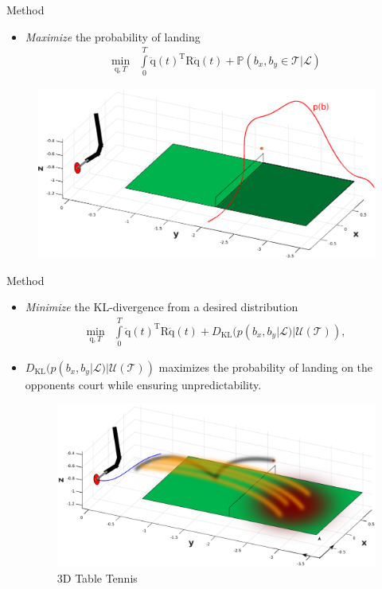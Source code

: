 \documentclass[handout]{beamer}
\newcommand{\boldvec}[1]{\boldsymbol{\mathrm{#1}}}
\let\vec\boldvec
\newcommand{\joint}{\vec{q}} %
\newcommand{\court}{\mathcal{T}} %
\newcommand{\prob}{\mathbb{P}} %
\newcommand{\landEvent}{\mathcal{L}} %
\newcommand{\KL}{D_{\mathrm{KL}}}
\begin{document}
\begin{frame}{Method}
\begin{itemize}
\item \emph{Maximize} the probability of landing
%
\begin{align}
\min_{\joint,T} & \int\limits_{0}^{T}\ddot{\joint}(t)^{\mathrm{T}}\vec{R}\ddot{\joint}(t) + \prob(b_x,b_y \in \court|\landEvent)
\label{costFnc1}
\end{align}
\end{itemize}
\begin{figure}[t!]
\center
\includegraphics[scale=0.25]{probLand.eps}		
\label{robot2}
\end{figure}
\end{frame}
%
\begin{frame}{Method}
\begin{itemize}
\item \emph{Minimize} the KL-divergence from a desired distribution
%
\begin{align}
\min_{\joint,T} & \int\limits_{0}^{T}\ddot{\joint}(t)^{\mathrm{T}}\vec{R}\ddot{\joint}(t) + \KL(p(b_x,b_y|\landEvent)|\mathcal{U}(\court)),
\label{costFnc2}
\end{align}
\item $\KL(p(b_x,b_y|\landEvent)|\mathcal{U}(\court))$ maximizes the probability of landing on the opponents court while ensuring unpredictability.
\begin{figure}[t!]
\center
\includegraphics[scale=0.25]{tableTennis3DwithUncertainty.eps}			
\caption{3D Table Tennis}
\end{figure}
\end{itemize}
\end{frame}
%
\end{document}
